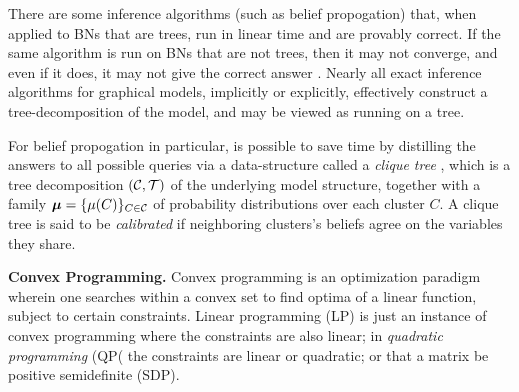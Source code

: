 \documentclass[twoside]{article}
\begin{document}
There are some inference algorithms (such as belief propogation) that,
when applied to BNs that are trees, run in linear time and are
provably correct.  
If the same algorithm is run on BNs that are not trees, then it 
may not converge, and even if it does, 
it may not give the correct answer \parencite{wainwright2008graphical}.  
Nearly all exact inference algorithms for graphical models, 
implicitly or explicitly, effectively construct a tree-decomposition
of the model, and may be viewed as running on a tree.

For belief propogation in particular, is possible to save time by
distilling the answers to all possible queries via a data-structure
called a \emph{clique tree} 
\parencite{koller2009probabilistic}, which is a tree decomposition $(\cal C, T)$
of the underlying model structure, together with a family $\boldsymbol\mu = \{\mu(C)\}_{ C \in \mathcal C}$ of probability distributions over each cluster $C$. 
A clique tree is said to be \emph{calibrated} if neighboring
clusters's beliefs agree on the variables they share.


\textbf{Convex Programming.}
Convex programming is an optimization paradigm wherein one searches
within a convex set to find optima of a linear function, subject to
certain constraints.  
Linear programming (LP) is just an instance of convex programming
where the constraints are also linear; in \emph{quadratic programming} (QP(
the constraints are linear or quadratic;
or that a matrix be positive semidefinite (SDP). 
\end{document}
